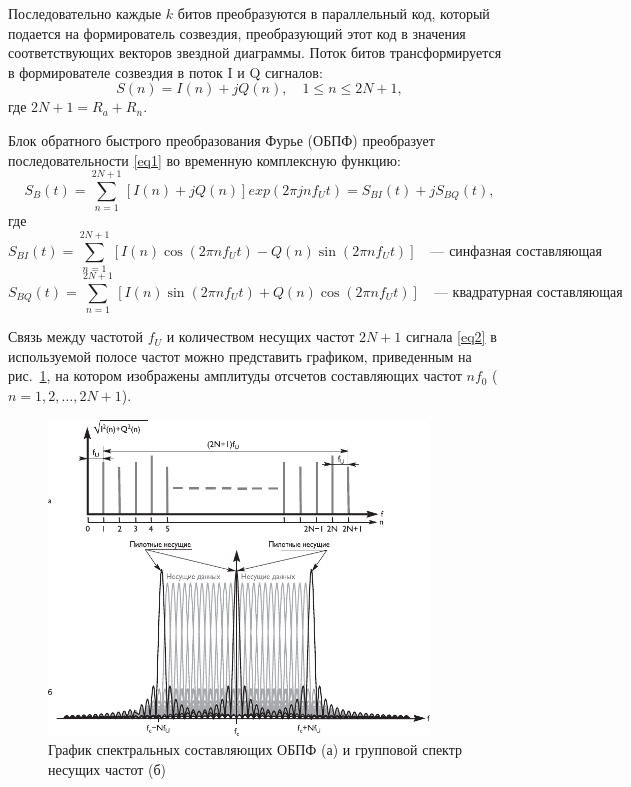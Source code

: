 Последовательно каждые $k$ битов преобразуются в параллельный код, который подается на формирователь созвездия, преобразующий этот код в значения соответствующих векторов звездной диаграммы.
Поток битов трансформируется в формирователе созвездия в поток I и Q сигналов:
\begin{equation}\label{eq1}
S(n) = I(n) + jQ(n),\quad 1 \leqslant n \leqslant 2N + 1,
\end{equation}
где $2N + 1 = R_a + R_n.$


Блок обратного быстрого преобразования Фурье (ОБПФ) преобразует последовательности \eqref{eq1} во временную комплексную функцию:
\begin{equation} \label{eq2}
S_B(t) = \sum_{n = 1}^{2N + 1}[I(n) + jQ(n)]exp(2\pi jnf_U t) = S_{BI}(t) + jS_{BQ}(t), 
\end{equation}
где
\[ S_{BI}(t) = \sum_{n = 1}^{2N + 1}[I(n)\cos(2\pi nf_Ut) - Q(n)\sin(2\pi nf_Ut)] \quad \mbox{--- синфазная составляющая} \]
\[ S_{BQ}(t) = \sum_{n = 1}^{2N + 1}[I(n)\sin(2\pi nf_Ut) + Q(n)\cos(2\pi nf_Ut)] \quad \mbox{--- квадратурная составляющая} \]

Связь между частотой $f_U$ и количеством несущих частот $2N + 1$ сигнала \eqref{eq2} в используемой полосе частот можно представить графиком, приведенным на рис.~\ref{ofdm2}, на котором изображены амплитуды отсчетов составляющих частот $nf_0$ ($n = 1, 2, \ldots, 2N + 1$).

\begin{figure}[h]
\centering
\includegraphics[width = 0.9\textwidth]{ofdm2.pdf}
\caption{График спектральных составляющих ОБПФ (а) и групповой спектр несущих частот (б)}
\label{ofdm2}
\end{figure}

